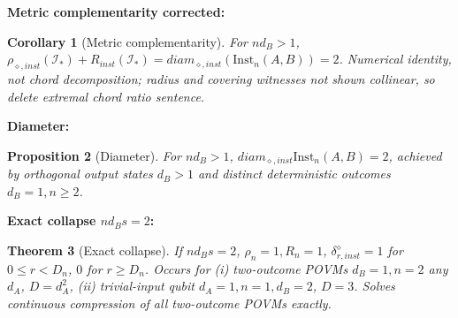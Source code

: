 \documentclass[11pt,a4paper]{article}
\newtheorem{theorem}{Theorem}[section]
\newtheorem{proposition}[theorem]{Proposition}
\newtheorem{corollary}[theorem]{Corollary}
\newcommand{\Inst}{\mathrm{Inst}}
\begin{document}
\textbf{Metric complementarity corrected:}
\begin{corollary}[Metric complementarity]
For $nd_B>1$, $\rho_{\diamond,inst}(\mathcal I_*)+R_{inst}(\mathcal I_*)=diam_{\diamond,inst}(\Inst_n(A,B))=2$. Numerical identity, not chord decomposition; radius and covering witnesses not shown collinear, so delete extremal chord ratio sentence.
\end{corollary}

\textbf{Diameter:}
\begin{proposition}[Diameter]
For $nd_B>1$, $diam_{\diamond,inst}\Inst_n(A,B)=2$, achieved by orthogonal output states $d_B>1$ and distinct deterministic outcomes $d_B=1,n\ge2$.
\end{proposition}

\textbf{Exact collapse $nd_Bs=2$:}
\begin{theorem}[Exact collapse]
If $nd_Bs=2$, $\rho_n=1,R_n=1$, $\delta_{r,inst}^\diamond=1$ for $0\le r<D_n$, $0$ for $r\ge D_n$. Occurs for (i) two-outcome POVMs $d_B=1,n=2$ any $d_A$, $D=d_A^2$, (ii) trivial-input qubit $d_A=1,n=1,d_B=2$, $D=3$. Solves continuous compression of all two-outcome POVMs exactly.
\end{theorem}
\end{document}
